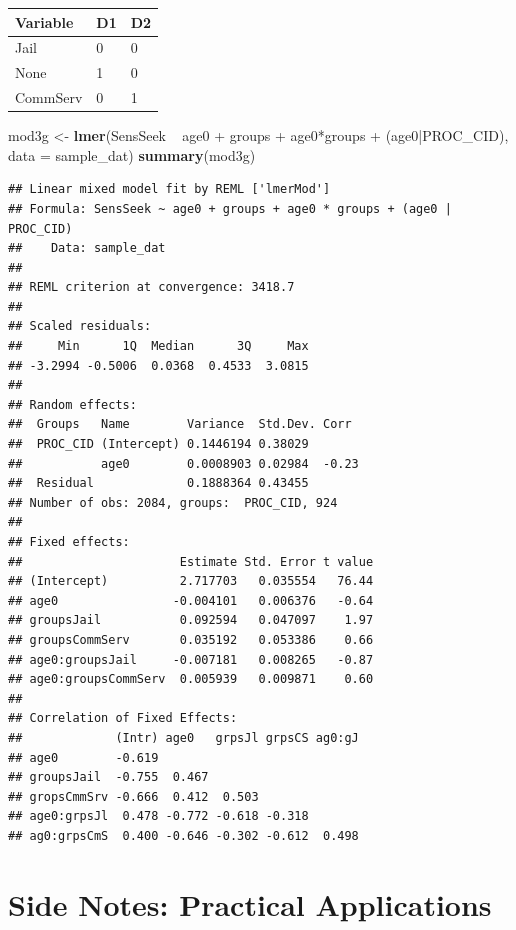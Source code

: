 \documentclass[]{article}
\newenvironment{Shaded}{\begin{snugshade}}{\end{snugshade}}
\newcommand{\KeywordTok}[1]{\textcolor[rgb]{0.13,0.29,0.53}{\textbf{{#1}}}}
\newcommand{\DataTypeTok}[1]{\textcolor[rgb]{0.13,0.29,0.53}{{#1}}}
\newcommand{\StringTok}[1]{\textcolor[rgb]{0.31,0.60,0.02}{{#1}}}
\newcommand{\NormalTok}[1]{{#1}}
\begin{document}
\begin{longtable}[]{@{}lll@{}}
\toprule
Variable & D1 & D2\tabularnewline
\midrule
\endhead
Jail & 0 & 0\tabularnewline
None & 1 & 0\tabularnewline
CommServ & 0 & 1\tabularnewline
\bottomrule
\end{longtable}

\small

\begin{Shaded}
\begin{Highlighting}[]
\NormalTok{mod3g <-}\StringTok{ }\KeywordTok{lmer}\NormalTok{(SensSeek ~}\StringTok{ }\NormalTok{age0 +}\StringTok{ }\NormalTok{groups +}\StringTok{ }\NormalTok{age0*groups +}\StringTok{ }
\StringTok{                }\NormalTok{(age0|PROC_CID), }\DataTypeTok{data =} \NormalTok{sample_dat)}
\KeywordTok{summary}\NormalTok{(mod3g)}
\end{Highlighting}
\end{Shaded}

\begin{verbatim}
## Linear mixed model fit by REML ['lmerMod']
## Formula: SensSeek ~ age0 + groups + age0 * groups + (age0 | PROC_CID)
##    Data: sample_dat
## 
## REML criterion at convergence: 3418.7
## 
## Scaled residuals: 
##     Min      1Q  Median      3Q     Max 
## -3.2994 -0.5006  0.0368  0.4533  3.0815 
## 
## Random effects:
##  Groups   Name        Variance  Std.Dev. Corr 
##  PROC_CID (Intercept) 0.1446194 0.38029       
##           age0        0.0008903 0.02984  -0.23
##  Residual             0.1888364 0.43455       
## Number of obs: 2084, groups:  PROC_CID, 924
## 
## Fixed effects:
##                      Estimate Std. Error t value
## (Intercept)          2.717703   0.035554   76.44
## age0                -0.004101   0.006376   -0.64
## groupsJail           0.092594   0.047097    1.97
## groupsCommServ       0.035192   0.053386    0.66
## age0:groupsJail     -0.007181   0.008265   -0.87
## age0:groupsCommServ  0.005939   0.009871    0.60
## 
## Correlation of Fixed Effects:
##             (Intr) age0   grpsJl grpsCS ag0:gJ
## age0        -0.619                            
## groupsJail  -0.755  0.467                     
## gropsCmmSrv -0.666  0.412  0.503              
## age0:grpsJl  0.478 -0.772 -0.618 -0.318       
## ag0:grpsCmS  0.400 -0.646 -0.302 -0.612  0.498
\end{verbatim}

\normalsize

\section{Side Notes: Practical
Applications}\label{side-notes-practical-applications}
\end{document}
